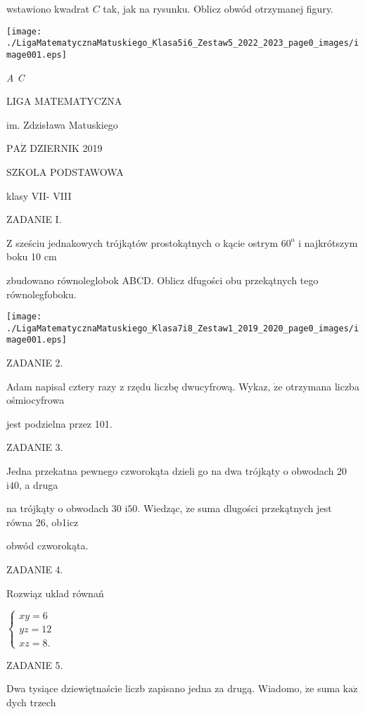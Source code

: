 \documentclass[a4paper,12pt]{article}
\begin{document}
wstawiono kwadrat $C$ tak, jak na rysunku. Oblicz obwód otrzymanej figury.
\begin{center}
\texttt{[image: ./LigaMatematycznaMatuskiego\_Klasa5i6\_Zestaw5\_2022\_2023\_page0\_images/image001.eps]}
\end{center}
{\it A  C}






LIGA MATEMATYCZNA

im. Zdzisława Matuskiego

$\mathrm{P}\mathrm{A}\dot{\mathrm{Z}}$ DZIERNIK 2019

SZKOLA PODSTAWOWA

klasy VII- VIII

ZADANIE I.

$\mathrm{Z}$ sześciu jednakowych trójkątów prostokątnych o kącie ostrym $60^{\mathrm{o}}$ i najkrótszym boku 10 cm

zbudowano równoleglobok ABCD. Oblicz dfugości obu przekątnych tego równolegfoboku.
\begin{center}
\texttt{[image: ./LigaMatematycznaMatuskiego\_Klasa7i8\_Zestaw1\_2019\_2020\_page0\_images/image001.eps]}
\end{center}
ZADANIE 2.

Adam napisal cztery razy z rzędu liczbę dwucyfrową. Wykaz, $\dot{\mathrm{z}}\mathrm{e}$ otrzymana liczba ośmiocyfrowa

jest podzielna przez 101.

ZADANIE 3.

Jedna przekatna pewnego czworokąta dzieli go na dwa trójkąty o obwodach 20 $\mathrm{i}40$, a druga

na trójkąty o obwodach 30 $\mathrm{i}50$. Wiedząc, $\dot{\mathrm{z}}\mathrm{e}$ suma dlugości przekątnych jest równa 26, ob1icz

obwód czworokąta.

ZADANIE 4.

Rozwiąz uklad równań

$\left\{\begin{array}{l}
xy=6\\
yz=12\\
xz=8.
\end{array}\right.$

ZADANIE 5.

Dwa tysiące dziewiętnaście liczb zapisano jedna za drugą. Wiadomo, $\dot{\mathrm{z}}\mathrm{e}$ suma $\mathrm{k}\mathrm{a}\dot{\mathrm{z}}$ dych trzech
\end{document}
